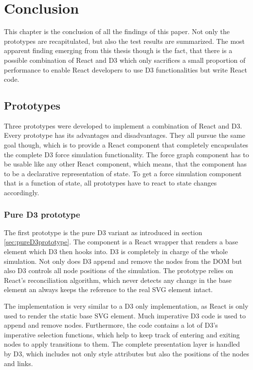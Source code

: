 \chapter{Conclusion}
\label{cha:conclusion}

This chapter is the conclusion of all the findings of this paper. Not only the prototypes are recapitulated, but also the test results are summarized. The most apparent finding emerging from this thesis though is the fact, that there is a possible combination of React and D3 which only sacrifices a small proportion of performance to enable React developers to use D3 functionalities but write React code.

\section{Prototypes}

Three prototypes were developed to implement a combination of React and D3. Every prototype has its advantages and disadvantages. They all pursue the same goal though, which is to provide a React component that completely encapsulates the complete D3 force simulation functionality. The force graph component has to be usable like any other React component, which means, that the component has to be a declarative representation of state. To get a force simulation component that is a function of state, all prototypes have to react to state changes accordingly.

\subsection{Pure D3 prototype}

The first prototype is the pure D3 variant as introduced in section \ref{sec:pureD3prototype}. The component is a React wrapper that renders a base element which D3 then hooks into. D3 is completely in charge of the whole simulation. Not only does D3 append and remove the nodes from the DOM but also D3 controls all node positions of the simulation. The prototype relies on React's reconciliation algorithm, which never detects any change in the base element an always keeps the reference to the real SVG element intact.

The implementation is very similar to a D3 only implementation, as React is only used to render the static base SVG element. Much imperative D3 code is used to append and remove nodes. Furthermore, the code contains a lot of D3's imperative selection functions, which help to keep track of entering and exiting nodes to apply transitions to them. The complete presentation layer is handled by D3, which includes not only style attributes but also the positions of the nodes and links.

